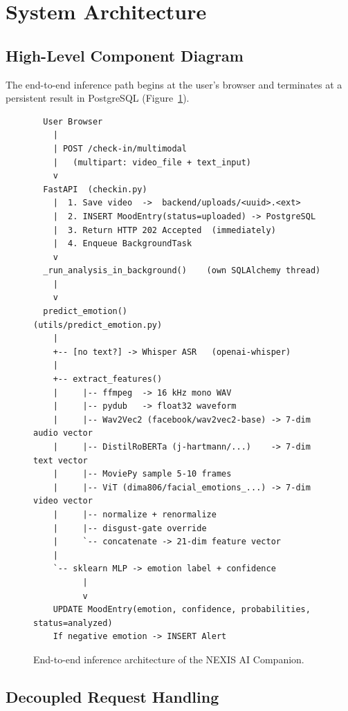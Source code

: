 \documentclass[12pt,a4paper]{article}
\begin{document}
\section{System Architecture}
\label{sec:architecture}

\subsection{High-Level Component Diagram}

The end-to-end inference path begins at the user's browser and terminates at
a persistent result in PostgreSQL (Figure~\ref{fig:arch}).

\begin{figure}[H]
\centering
\begin{verbatim}
  User Browser
    |
    | POST /check-in/multimodal
    |   (multipart: video_file + text_input)
    v
  FastAPI  (checkin.py)
    |  1. Save video  ->  backend/uploads/<uuid>.<ext>
    |  2. INSERT MoodEntry(status=uploaded) -> PostgreSQL
    |  3. Return HTTP 202 Accepted  (immediately)
    |  4. Enqueue BackgroundTask
    v
  _run_analysis_in_background()    (own SQLAlchemy thread)
    |
    v
  predict_emotion()                (utils/predict_emotion.py)
    |
    +-- [no text?] -> Whisper ASR   (openai-whisper)
    |
    +-- extract_features()
    |     |-- ffmpeg  -> 16 kHz mono WAV
    |     |-- pydub   -> float32 waveform
    |     |-- Wav2Vec2 (facebook/wav2vec2-base) -> 7-dim audio vector
    |     |-- DistilRoBERTa (j-hartmann/...)    -> 7-dim text vector
    |     |-- MoviePy sample 5-10 frames
    |     |-- ViT (dima806/facial_emotions_...) -> 7-dim video vector
    |     |-- normalize + renormalize
    |     |-- disgust-gate override
    |     `-- concatenate -> 21-dim feature vector
    |
    `-- sklearn MLP -> emotion label + confidence
          |
          v
    UPDATE MoodEntry(emotion, confidence, probabilities, status=analyzed)
    If negative emotion -> INSERT Alert
\end{verbatim}
\caption{End-to-end inference architecture of the NEXIS AI Companion.}
\label{fig:arch}
\end{figure}

\subsection{Decoupled Request Handling}
\end{document}
